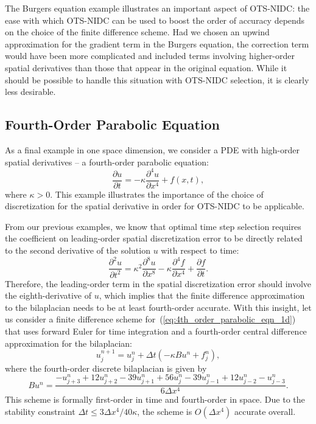 \documentclass[fleqn,12pt,twoside]{article}
\newcommand{\beq}{\begin{equation}}
\newcommand{\eeq}{\end{equation}}
\def\pt{\partial t}
\def\px{\partial x}
\def\dt{\Delta t}
\def\dx{\Delta x}
\begin{document}
The Burgers equation example illustrates an important aspect of OTS-NIDC:
the ease with which OTS-NIDC can be used to boost the order of accuracy 
depends on the choice of the finite difference scheme.  Had we chosen an 
upwind approximation for the gradient term in the Burgers equation, the 
correction term would have been more complicated and included terms involving 
higher-order spatial derivatives than those that appear in the original 
equation.  While it should be possible to handle this situation with OTS-NIDC 
selection, it is clearly less desirable.


\subsection{Fourth-Order Parabolic Equation}
As a final example in one space dimension, we consider a PDE with high-order
spatial derivatives -- a fourth-order parabolic equation: 
\beq
  \frac{\partial u}{\pt} = -\kappa \frac{\partial^4 u}{\px^4} + f(x,t), 
  \label{eq:4th_order_parabolic_eqn_1d}
\eeq
where $\kappa > 0$.  This example illustrates the importance of the choice of
discretization for the spatial derivative in order for OTS-NIDC to be
applicable. 

From our previous examples, we know that optimal time step selection requires 
the coefficient on leading-order spatial discretization error to be directly 
related to the second derivative of the solution $u$ with respect to time:
\beq
  \frac{\partial^2 u}{\pt^2} = 
    \kappa^2 \frac{\partial^8 u}{\px^8} 
  - \kappa \frac{\partial^4 f}{\px^4} 
  + \frac{\partial f}{\pt}
  \label{eq:4th_order_parabolic_eqn_1d_second_time_derivative}.
\eeq
Therefore, the leading-order term in the spatial discretization 
error should involve the eighth-derivative of $u$, which implies that the
finite difference approximation to the bilaplacian needs to be at least 
fourth-order accurate.  With this insight, let us consider a finite 
difference scheme for~(\ref{eq:4th_order_parabolic_eqn_1d}) that 
uses forward Euler for time integration and a fourth-order central 
difference approximation for the bilaplacian:
\beq
  u^{n+1}_j = u^{n}_j + \dt \left( -\kappa B u^n + f_j^n \right), 
  \label{eq:4th_order_parabolic_eqn_1d_FD_scheme}
\eeq
where the fourth-order discrete bilaplacian is given by
\beq
  B u^n = \frac{ -u^{n}_{j+3} + 12 u^{n}_{j+2} - 39 u^{n}_{j+1}
               + 56 u^{n}_j
               - 39 u^{n}_{j-1} + 12 u^{n}_{j-2} -u^{n}_{j-3} }
               {6 \dx^4}.
\eeq
This scheme is formally first-order in time and fourth-order in space.  
Due to the stability constraint $\dt \le 3\dx^4/40 \kappa$, the scheme is 
$O(\dx^4)$ accurate overall.
\end{document}
